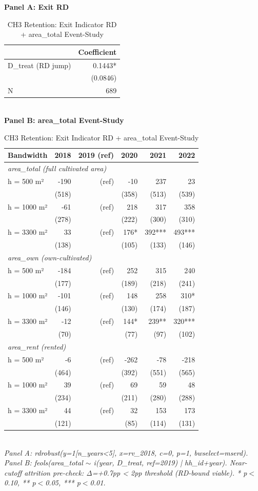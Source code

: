 \begin{table}[t]
\centering
\caption{CH3 Retention: Exit Indicator RD + area\_total Event-Study}
\label{tab:ch3_retention_en}
\textbf{Panel A: Exit RD}\\
\begin{tabular}{lr}
\toprule
 & Coefficient \\
\midrule
D\_treat (RD jump) & 0.1443* \\
 & (0.0846) \\
N          & 689 \\
\bottomrule
\end{tabular}\\[1ex]
\textbf{Panel B: area\_total Event-Study}\\
\begin{tabular}{lrrrrr}
\toprule
Bandwidth & 2018 & 2019 (ref) & 2020 & 2021 & 2022 \\
\midrule
\multicolumn{6}{l}{\textit{area\_total (full cultivated area)}} \\
\midrule
h = 500 m² & -190 & (ref) & -10 & 237 & 23 \\
       & (518) &  & (358) & (513) & (539) \\
h = 1000 m² & -61 & (ref) & 218 & 317 & 358 \\
       & (278) &  & (222) & (300) & (310) \\
h = 3300 m² & 33 & (ref) & 176* & 392*** & 493*** \\
       & (138) &  & (105) & (133) & (146) \\
\midrule
\multicolumn{6}{l}{\textit{area\_own (own-cultivated)}} \\
\midrule
h = 500 m² & -184 & (ref) & 252 & 315 & 240 \\
       & (177) &  & (189) & (218) & (241) \\
h = 1000 m² & -101 & (ref) & 148 & 258 & 310* \\
       & (146) &  & (130) & (174) & (187) \\
h = 3300 m² & -12 & (ref) & 144* & 239** & 320*** \\
       & (70) &  & (77) & (97) & (102) \\
\midrule
\multicolumn{6}{l}{\textit{area\_rent (rented)}} \\
\midrule
h = 500 m² & -6 & (ref) & -262 & -78 & -218 \\
       & (464) &  & (392) & (551) & (565) \\
h = 1000 m² & 39 & (ref) & 69 & 59 & 48 \\
       & (234) &  & (211) & (280) & (288) \\
h = 3300 m² & 44 & (ref) & 32 & 153 & 173 \\
       & (121) &  & (85) & (114) & (131) \\
\bottomrule
\end{tabular}\\
\footnotesize\textit{Panel A: rdrobust(y=1[n\_years<5], x=rv\_2018, c=0, p=1, bwselect=mserd). Panel B: feols(area\_total $\sim$ i(year, D\_treat, ref=2019) | hh\_id+year). Near-cutoff attrition pre-check: Δ=+0.7pp < 2pp threshold (RD-bound viable). * p$<$0.10, ** p$<$0.05, *** p$<$0.01.}
\end{table}

